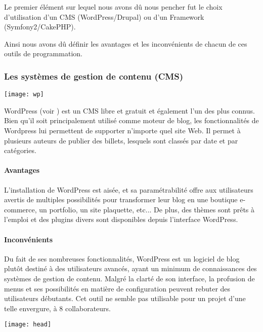 Le premier élément sur lequel nous avons dû nous pencher fut le choix d'utilisation d'un CMS (WordPress/Drupal) ou d'un Framework (Symfony2/CakePHP).

Ainsi nous avons dû définir les avantages et les inconvénients de chacun de ces outils de programmation.

\subsubsection{Les systèmes de gestion de contenu (CMS)}


\begin{center}\texttt{[image: wp]}\end{center}

WordPress (voir \cite{wp}) est un CMS libre et gratuit et également l'un des plus connus.
Bien qu'il soit principalement utilisé comme moteur de blog, les fonctionnalités de Wordpress lui permettent de supporter n'importe quel site Web.
Il permet à plusieurs auteurs de publier des billets, lesquels sont classés par date et par catégories.

\paragraph{Avantages}
L'installation de WordPress est aisée, et sa paramétrabilité offre aux utilisateurs avertis de multiples possibilités pour transformer leur blog en une boutique e-commerce, un portfolio, un site plaquette, etc...
De plus, des thèmes sont prêts à l'emploi et des plugins divers sont disponibles depuis l'interface WordPress.

\paragraph{Inconvénients}
Du fait de ses nombreuses fonctionnalités, WordPress est un logiciel de blog plutôt destiné à des utilisateurs avancés, ayant un minimum de connaissances des systèmes de gestion de contenu.
Malgré la clarté de son interface, la profusion de menus et ses possibilités en matière de configuration peuvent rebuter des utilisateurs débutants. 
Cet outil ne semble pas utilisable pour un projet d'une telle envergure, à 8 collaborateurs.


\begin{center}\texttt{[image: head]}\end{center}

